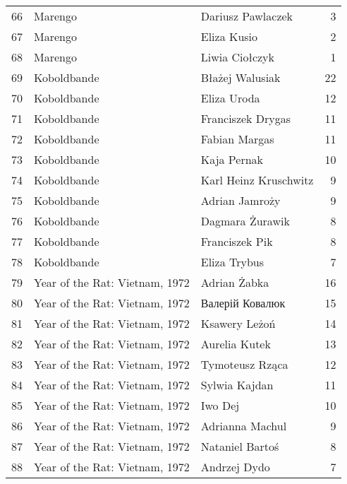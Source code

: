 \begin{table}[h]
\begin{tabular}{rllr}
 66 & Marengo                        & Dariusz Pawlaczek     &       3 \\
 67 & Marengo                        & Eliza Kusio           &       2 \\
 68 & Marengo                        & Liwia Ciołczyk        &       1 \\
 69 & Koboldbande                    & Błażej Walusiak       &      22 \\
 70 & Koboldbande                    & Eliza Uroda           &      12 \\
 71 & Koboldbande                    & Franciszek Drygas     &      11 \\
 72 & Koboldbande                    & Fabian Margas         &      11 \\
 73 & Koboldbande                    & Kaja Pernak           &      10 \\
 74 & Koboldbande                    & Karl Heinz Kruschwitz &       9 \\
 75 & Koboldbande                    & Adrian Jamroży        &       9 \\
 76 & Koboldbande                    & Dagmara Żurawik       &       8 \\
 77 & Koboldbande                    & Franciszek Pik        &       8 \\
 78 & Koboldbande                    & Eliza Trybus          &       7 \\
 79 & Year of the Rat: Vietnam, 1972 & Adrian Żabka          &      16 \\
 80 & Year of the Rat: Vietnam, 1972 & Валерій Ковалюк       &      15 \\
 81 & Year of the Rat: Vietnam, 1972 & Ksawery Leżoń         &      14 \\
 82 & Year of the Rat: Vietnam, 1972 & Aurelia Kutek         &      13 \\
 83 & Year of the Rat: Vietnam, 1972 & Tymoteusz Rząca       &      12 \\
 84 & Year of the Rat: Vietnam, 1972 & Sylwia Kajdan         &      11 \\
 85 & Year of the Rat: Vietnam, 1972 & Iwo Dej               &      10 \\
 86 & Year of the Rat: Vietnam, 1972 & Adrianna Machul       &       9 \\
 87 & Year of the Rat: Vietnam, 1972 & Nataniel Bartoś       &       8 \\
 88 & Year of the Rat: Vietnam, 1972 & Andrzej Dydo          &       7 \\
\hline
\end{tabular}\end{table}